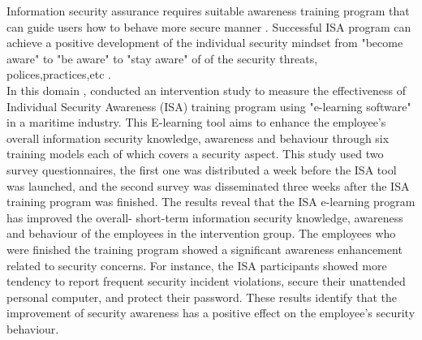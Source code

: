 Information security assurance requires suitable awareness training program that can guide users how to behave more secure manner \cite{Safa2015}. Successful ISA program can achieve a positive development of the individual security mindset from "become aware" to "be aware" to "stay aware" of of the security threats, polices,practices,etc \cite{Shaw2009,Schlienger2002}. \\
In this domain , \citet{MereteHagen2009} conducted an intervention study to measure the effectiveness of Individual Security  Awareness (ISA) training program using "e-learning software" in a maritime industry. This E-learning tool aims to enhance the employee's overall information security knowledge, awareness and behaviour through six training models each of which covers a security aspect. This study used two survey questionnaires, the first one was distributed a week before the ISA tool was launched, and the second survey was disseminated three weeks after the ISA training program was finished. The results reveal that the ISA e-learning program has improved the overall- short-term information security knowledge, awareness and behaviour of the employees in the intervention group. The employees who were finished the training program showed a significant awareness enhancement related to security concerns. For instance, the ISA participants showed more tendency to report frequent security incident violations, secure their unattended personal computer, and protect their password. These results identify that the improvement of security awareness has a positive effect on the employee's security behaviour.

